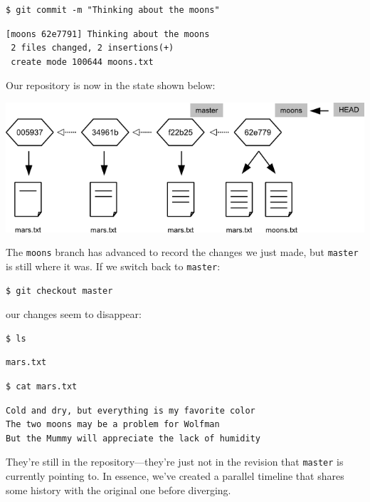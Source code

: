 \documentclass[]{book}
\begin{document}
\begin{verbatim}
$ git commit -m "Thinking about the moons"
\end{verbatim}

\begin{verbatim}
[moons 62e7791] Thinking about the moons
 2 files changed, 2 insertions(+)
 create mode 100644 moons.txt
\end{verbatim}

Our repository is now in the state shown below:

\includegraphics{novice/extras/img/git-branching-04.png}

The \texttt{moons} branch has advanced to record the changes we just
made, but \texttt{master} is still where it was. If we switch back to
\texttt{master}:

\begin{verbatim}
$ git checkout master
\end{verbatim}

our changes seem to disappear:

\begin{verbatim}
$ ls
\end{verbatim}

\begin{verbatim}
mars.txt
\end{verbatim}

\begin{verbatim}
$ cat mars.txt
\end{verbatim}

\begin{verbatim}
Cold and dry, but everything is my favorite color
The two moons may be a problem for Wolfman
But the Mummy will appreciate the lack of humidity
\end{verbatim}

They're still in the repository---they're just not in the revision that
\texttt{master} is currently pointing to. In essence, we've created a
parallel timeline that shares some history with the original one before
diverging.
\end{document}
